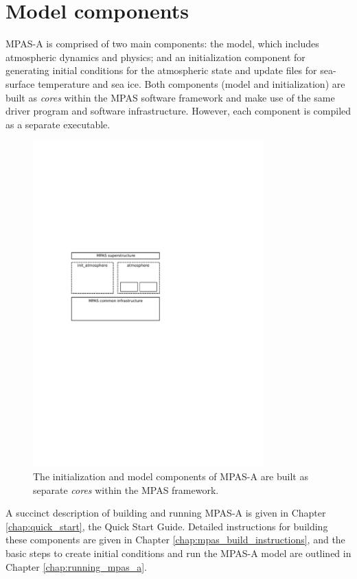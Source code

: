 \section{Model components}

MPAS-A is comprised of two main components: the model, which includes
atmospheric dynamics and physics; and an initialization component for
generating initial conditions for the atmospheric state and update files for sea-surface
temperature and sea ice. Both components (model and initialization) are built as {\it cores}
within the MPAS software framework and make use of the same driver
program and software infrastructure.  However, each component is compiled as
a separate executable.

\begin{figure}[htb]
\begin{center}
\includegraphics[width=3.5in]{figures/mpas-a_components.pdf}
\caption{The initialization and model components of MPAS-A are built as
separate {\em cores} within the MPAS framework.}
\label{fig:atm_components}
\end{center}
\end{figure}

A succinct description of building and running MPAS-A is given in Chapter \ref{chap:quick_start}, the Quick Start Guide.
Detailed instructions for building these components are given in Chapter
\ref{chap:mpas_build_instructions}, and the basic steps to create initial
conditions and run the MPAS-A model are outlined in Chapter
\ref{chap:running_mpas_a}.
